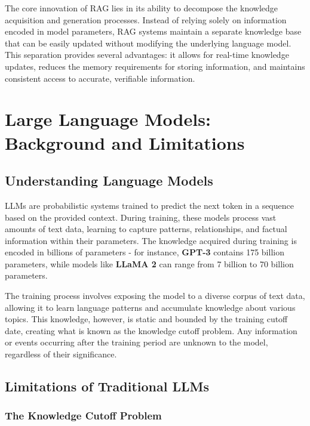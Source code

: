\documentclass[12pt]{article}
\begin{document}
    The core innovation of RAG lies in its ability to decompose the knowledge acquisition 
    and generation processes. Instead of relying solely on information encoded in model 
    parameters, RAG systems maintain a separate knowledge base that can be easily updated 
    without modifying the underlying language model. This separation provides several 
    advantages: it allows for real-time knowledge updates, reduces the memory requirements 
    for storing information, and maintains consistent access to accurate, verifiable information.
    
    \section{Large Language Models: Background and Limitations}
    
    \subsection{Understanding Language Models}
    LLMs are probabilistic systems trained to predict the next token 
    in a sequence based on the provided context. During training, these models process vast 
    amounts of text data, learning to capture patterns, relationships, and factual information 
    within their parameters. The knowledge acquired during training is encoded in billions of 
    parameters - for instance, \textbf{GPT-3} \cite{gpt3} contains 175 billion parameters, while models 
    like \textbf{LLaMA 2} \cite{llama2} can range from 7 billion to 70 billion parameters.

    The training process involves exposing the model to a diverse corpus of text data, 
    allowing it to learn language patterns and accumulate knowledge about various topics. 
    This knowledge, however, is static and bounded by the training cutoff date, creating 
    what is known as the knowledge cutoff problem. Any information or events occurring after 
    the training period are unknown to the model, regardless of their significance.

    \subsection{Limitations of Traditional LLMs}
    
    \subsubsection{The Knowledge Cutoff Problem}
    
\end{document}
